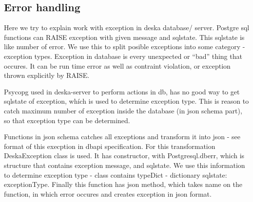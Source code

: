\documentclass[deska]{subfiles}
\begin{document}
\subsection{Error handling}
Here we try to explain work with exception in deska database/ server. Postgre sql functions can RAISE exception with given message and sqlstate.
This sqlstate is like number of error. We use this to split posible exceptions into some category - exception types. Exception in database is
every unexpected or “bad” thing that occures. It can be run time error as well as contraint violation, or exception thrown explicitly by RAISE.

Psycopg used in deska-server to perform actions in db, has no good way to get sqlstate of exception, whích is used to determine exception type.
This is reason to catch maximum number of exception inside the database (in json schema part), so that exception type can be determined.

Functions in json schema catches all exceptions and transform it into json - see format of this execption in dbapi specification.
For this transformation DeskaException class is used. It has constructor, with Postgresql.dberr, which is structure that contains exception
message, and sqlstate. We use this information to determine exception type - class contains typeDict - dictionary {sqlstate: exceptionType}.
Finally this function has json method, which takes name on the function, in which error occures and creates exception in json format.
\end{document}
